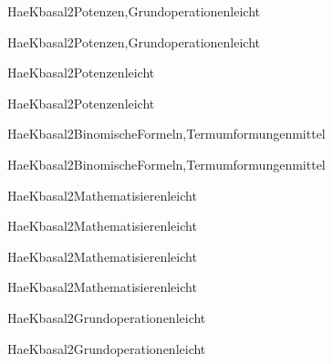 \documentclass[12pt]{article}
\begin{document}
\begin{Add}{HaeK}{basal2}{Potenzen,Grundoperationen}{leicht}
\solution{ }
\end{Add}
\begin{Add}{HaeK}{basal2}{Potenzen,Grundoperationen}{leicht}
\end{Add}

\begin{Add}{HaeK}{basal2}{Potenzen}{leicht}
\solution{ }
\end{Add}
\begin{Add}{HaeK}{basal2}{Potenzen}{leicht}
\end{Add}

\begin{Add}{HaeK}{basal2}{BinomischeFormeln,Termumformungen}{mittel}
\solution{ }
\end{Add}
\begin{Add}{HaeK}{basal2}{BinomischeFormeln,Termumformungen}{mittel}
\end{Add}

\begin{Add}{HaeK}{basal2}{Mathematisieren}{leicht}
\solution{ }
\end{Add}
\begin{Add}{HaeK}{basal2}{Mathematisieren}{leicht}
\end{Add}

\begin{Add}{HaeK}{basal2}{Mathematisieren}{leicht}
\solution{ }
\end{Add}
\begin{Add}{HaeK}{basal2}{Mathematisieren}{leicht}
\end{Add}

\begin{Add}{HaeK}{basal2}{Grundoperationen}{leicht}
\solution{ }
\end{Add}
\begin{Add}{HaeK}{basal2}{Grundoperationen}{leicht}
\end{Add}
\end{document}
